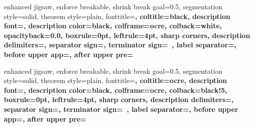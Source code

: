 %
{enhanced jigsaw,%
	enforce breakable,%
	shrink break goal=0.5\baselineskip,%
	segmentation style=solid,%
	theorem style=plain,%
	fonttitle=\sffamily\upshape\bfseries\small,%
	coltitle=black,%
	description font=\sffamily\upshape\bfseries\small,%
	description color=black,%
	colframe=ocre,%
	colback=white,%
	opacityback=0.0,%
	boxrule=0pt,%
	leftrule=4pt,%
	sharp corners,%
	description delimiters={}{},%
	separator sign={\nobreakspace {\color{black}---}},%
	terminator sign={\ },%
	label separator=,
	before upper app={},%
	after upper pre={\popdimen{\parindent}}}%
{}

%
{enhanced jigsaw,%
	enforce breakable,%
	shrink break goal=0.5\baselineskip,%
	segmentation style=solid,%
	theorem style=plain,%
	fonttitle=\sffamily\upshape\bfseries\small,%
	coltitle=ocre,%
	description font=\sffamily\upshape\bfseries\small,%
	description color=black,%
	colframe=ocre,%
	colback=black!5,%
	boxrule=0pt,%
	leftrule=4pt,%
	sharp corners,%
	description delimiters={}{},%
	separator sign={\nobreakspace {\color{black}---}},%
	terminator sign={\ },%
	label separator=,
	before upper app={},%
	after upper pre={\popdimen{\parindent}}}%
{}

